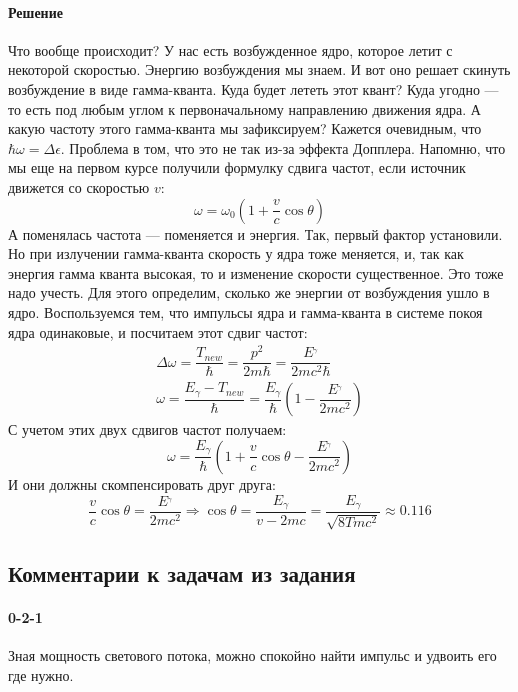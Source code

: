 \documentclass[12pt]{article}
\begin{document}
\paragraph{Решение} Что вообще происходит? У нас есть возбужденное ядро, которое летит с некоторой скоростью. Энергию возбуждения мы знаем. И вот оно решает скинуть возбуждение в виде гамма-кванта. Куда будет лететь этот квант? Куда угодно --- то есть под любым углом к первоначальному направлению движения ядра. А какую частоту этого гамма-кванта мы зафиксируем? Кажется очевидным, что $\hbar\omega = \Delta \epsilon$. Проблема в том, что это не так из-за эффекта Допплера. Напомню, что мы еще на первом курсе получили формулку сдвига частот, если источник движется со скоростью $v$:
\begin{equation*}
    \omega = \omega_0 \left(1+ \dfrac{v}{c}\cos{\theta} \right)
\end{equation*}
А поменялась частота --- поменяется и энергия. Так, первый фактор установили. Но при излучении гамма-кванта скорость у ядра тоже меняется, и, так как энергия гамма кванта высокая, то и изменение скорости существенное. Это тоже надо учесть. Для этого определим, сколько же энергии от возбуждения ушло в ядро. Воспользуемся тем, что импульсы ядра и гамма-кванта в системе покоя ядра одинаковые, и посчитаем этот сдвиг частот:
\begin{gather*}
    \Delta\omega = \dfrac{T_{new}}{\hbar} =  \dfrac{p^2}{2m\hbar} = \dfrac{E^_{\gamma}}{2mc^2\hbar}\\
    \omega = \dfrac{E_{\gamma} - T_{new}}{\hbar} = \dfrac{E_{\gamma}}{\hbar}(1-\dfrac{E^_{\gamma}}{2mc^2})
\end{gather*}
С учетом этих двух сдвигов частот получаем:
\begin{equation*}
    \omega = \dfrac{E_{\gamma}}{\hbar} \left(1+ \dfrac{v}{c}\cos{\theta} - \dfrac{E^_{\gamma}}{2mc^2}\right)
\end{equation*}
И они должны скомпенсировать друг друга:
\begin{equation*}
    \dfrac{v}{c}\cos{\theta} = \dfrac{E^_{\gamma}}{2mc^2} \Rightarrow \cos{\theta} = \dfrac{E_\gamma}{v-2mc} = \dfrac{E_\gamma}{\sqrt{8Tmc^2}} \approx 0.116
\end{equation*}


\subsection{Комментарии к задачам из задания}
\paragraph{0-2-1} Зная мощность светового потока, можно спокойно найти импульс и удвоить его где нужно.
\end{document}
